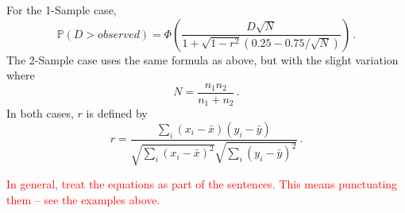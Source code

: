 \documentclass[codesnippet]{jss}
\newcommand{\RBnote}[1]{\textcolor{red}{#1}}
\begin{document}
For the 1-Sample case,
\begin{equation} \label{eq:4}
\mathbb{P}(D > observed) = \Phi \left( \frac{D\sqrt{N}}{1+\sqrt{1-r^2}(0.25-0.75/\sqrt{N})} \right) \, .
\end{equation}
The 2-Sample case uses the same formula as above, but with the slight variation where
\begin{equation} \label{eq:5}
N = \frac{n_1n_2}{n_1+n_2}\, .
\end{equation}
In both cases, $r$ is defined by
\begin{equation} \label{eq:6}
r = \frac{\sum_{i}^{}(x_i-\bar{x})(y_i-\bar{y})}{\sqrt{\sum_{i}^{}(x_i-\bar{x})^2}\sqrt{\sum_{i}^{}(y_i-\bar{y})^2}}\, .
\end{equation}

\RBnote{In general, treat the equations as part of the sentences.  This means punctuating them -- see the examples above.}
\end{document}

